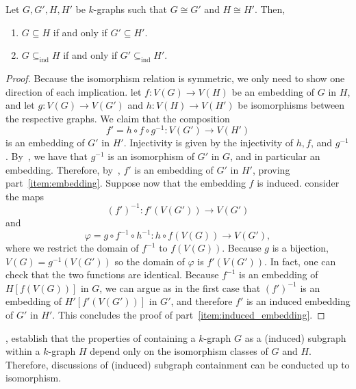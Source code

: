 \begin{proposition} \label{prop:isomorphism_preserves_embedding}
    Let $G, G', H, H'$ be $k$-graphs such that $G \cong G'$ and $H \cong H'$.
    Then,
    \begin{enumerate}
        \item $G \subseteq H$ if and only if $G' \subseteq H'$. \label{item:embedding}
        \item $G \subseteq_{\text{ind}} H$ if and only if $G' \subseteq_{\text{ind}} H'$. \label{item:induced_embedding}
    \end{enumerate}
    \begin{proof}
        Because the isomorphism relation is symmetric, we only need to show one direction of each implication.
        let $f: V(G) \to V(H)$ be an embedding of $G$ in $H$, and let
        $g: V(G) \to V(G')$ and $h: V(H) \to V(H')$ be isomorphisms between the respective graphs.
        We claim that the composition
        \[
            f' = h \circ f \circ g^{-1}: V(G') \to V(H')
        \]
        is an embedding of $G'$ in $H'$.
        Injectivity is given by the injectivity of $h, f$, and $g^{-1}$.
        By~, we have that $g^{-1}$ is an isomorphism of $G'$ in $G$,
        and in particular an embedding.
        Therefore, by~,
        $f'$ is an embedding of $G'$ in $H'$, proving part~\eqref{item:embedding}.
        Suppose now that the embedding $f$ is induced.
        consider the maps
        \[
            (f')^{-1}: f'(V(G')) \to V(G')
        \]
        and
        \[
            \varphi = g \circ f^{-1} \circ h^{-1}: h \circ f(V(G)) \to V(G'),
        \]
        where we restrict the domain of $f^{-1}$ to $f(V(G))$.
        Because $g$ is a bijection, $V(G) = g^{-1}(V(G'))$ so the
        domain of $\varphi$ is $f'(V(G'))$.
        In fact, one can check that the two functions are identical.
        Because $f^{-1}$ is an embedding of $H[f(V(G))]$ in $G$,
        we can argue as in the first case that
        $(f')^{-1}$ is an embedding of $H'[f'(V(G'))]$ in $G'$,
        and therefore $f'$ is an induced embedding of $G'$ in $H'$.
        This concludes the proof of part~\eqref{item:induced_embedding}.
    \end{proof}
\end{proposition}

,
establish that the properties of containing a $k$-graph $G$ as a (induced)
subgraph within a $k$-graph $H$ depend only on the isomorphism classes of $G$ and $H$.
Therefore, discussions of (induced) subgraph containment can be conducted up to isomorphism.